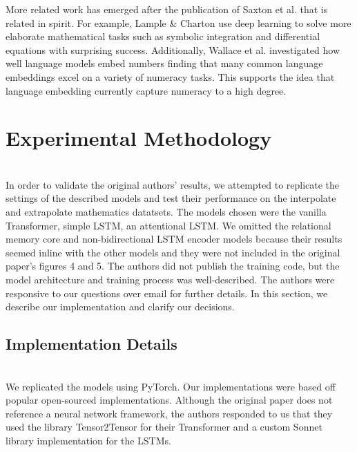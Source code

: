More related work has emerged after the publication of Saxton et al.\supercite{DBLP:journals/corr/abs-1904-01557} that is related in spirit. For example, Lample \& Charton \supercite{lample2019deep} use deep learning to solve more elaborate mathematical tasks such as symbolic integration and differential equations with surprising success.  Additionally, Wallace et al. \supercite{wallace2019nlp} investigated how well language models embed numbers finding that many common language embeddings excel on a variety of numeracy tasks. This supports the idea that language embedding currently capture numeracy to a high degree. \\


\section{Experimental Methodology} \\
In order to validate the original authors’ results, we attempted to replicate the settings of the described models and test their performance on the interpolate and extrapolate mathematics datatsets. The models chosen were the vanilla Transformer\supercite{vaswani2017attention}, simple LSTM, an attentional LSTM. We omitted the relational memory core and non-bidirectional LSTM encoder models because their results seemed inline with the other models and they were not included in the original paper’s figures 4 and 5. The authors did not publish the training code, but the model architecture and training process was well-described. The authors were responsive to our questions over email for further details. In this section, we describe our implementation and clarify our decisions. 

\subsection{Implementation Details} \\

We replicated the models using PyTorch\supercite{paszke2019pytorch}. Our implementations were based off popular open-sourced implementations\supercite{nlp-tutorial}\supercite{pytorch_math_dataset}\supercite{attention-is-all-you-need}. Although the original paper does not reference a neural network framework, the authors responded to us that they used the library Tensor2Tensor\supercite{vaswani2018tensor2tensor} for their Transformer and a custom Sonnet\supercite{sonnet} library implementation for the LSTMs.\\

